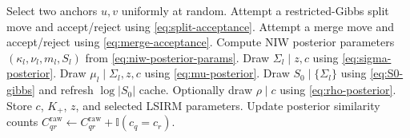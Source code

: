 \documentclass[11pt]{article}
\newcommand{\ind}{\mathbb I}
\begin{document}
\begin{algorithm}[H]
\caption{One MCMC sweep: split--merge, mixture-parameter update, and storage}
\small
\begin{algorithmic}[1]
    \State Select two anchors $u,v$ uniformly at random.
        \State Attempt a restricted-Gibbs split move and accept/reject using \eqref{eq:split-acceptance}.
    \Else
        \State Attempt a merge move and accept/reject using \eqref{eq:merge-acceptance}.
    \EndIf
\EndFor
{}
    \State Compute NIW posterior parameters $(\kappa_l,\nu_l,m_l,S_l)$ from \eqref{eq:niw-posterior-params}.
    \State Draw $\Sigma_l\mid z,c$ using \eqref{eq:sigma-posterior}.
    \State Draw $\mu_l\mid \Sigma_l,z,c$ using \eqref{eq:mu-posterior}.
\EndFor
\State Draw $S_0\mid\{\Sigma_l\}$ using \eqref{eq:S0-gibbs} and refresh $\log|S_0|$ cache.
\State Optionally draw $\rho\mid c$ using \eqref{eq:rho-posterior}.
    \State Store $c$, $K_+$, $z$, and selected LSIRM parameters.
    \State Update posterior similarity counts $C_{qr}^{\mathrm{raw}}\leftarrow C_{qr}^{\mathrm{raw}}+\ind(c_q=c_r)$.
\EndIf
\end{algorithmic}
\end{algorithm}
\end{document}
